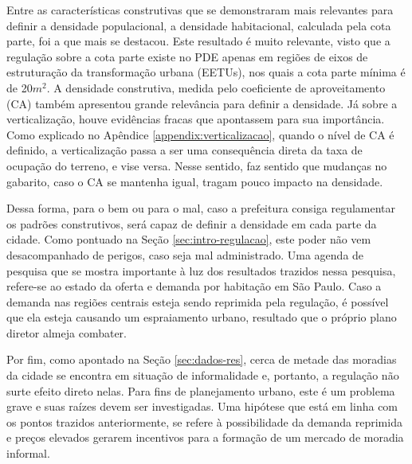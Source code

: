 Entre as características construtivas que se demonstraram mais relevantes para definir a densidade populacional, a densidade habitacional, calculada pela cota parte, foi a que mais se destacou. Este resultado é muito relevante, visto que a regulação sobre a cota parte existe no PDE apenas em regiões de eixos de estruturação da transformação urbana (EETUs), nos quais a cota parte mínima é de 20$m^2$. A densidade construtiva, medida pelo coeficiente de aproveitamento (CA) também apresentou grande relevância para definir a densidade. Já sobre a verticalização, houve evidências fracas que apontassem para sua importância. Como explicado no Apêndice \ref{appendix:verticalizacao}, quando o nível de CA é definido, a verticalização passa a ser uma consequência direta da taxa de ocupação do terreno, e vise versa. Nesse sentido, faz sentido que mudanças no gabarito, caso o CA se mantenha igual, tragam pouco impacto na densidade.

Dessa forma, para o bem ou para o mal, caso a prefeitura consiga regulamentar os padrões construtivos, será capaz de definir a densidade em cada parte da cidade. Como pontuado na Seção \ref{sec:intro-regulacao}, este poder não vem desacompanhado de perigos, caso seja mal administrado. Uma agenda de pesquisa que se mostra importante à luz dos resultados trazidos nessa pesquisa, refere-se ao estado da oferta e demanda por habitação em São Paulo. Caso a demanda nas regiões centrais esteja sendo reprimida pela regulação, é possível que ela esteja causando um espraiamento urbano, resultado que o próprio plano diretor almeja combater.

Por fim, como apontado na Seção \ref{sec:dados-res}, cerca de metade das moradias da cidade se encontra em situação de informalidade e, portanto, a regulação não surte efeito direto nelas. Para fins de planejamento urbano, este é um problema grave e suas raízes devem ser investigadas. Uma hipótese que está em linha com os pontos trazidos anteriormente, se refere à possibilidade da demanda reprimida e preços elevados gerarem incentivos para a formação de um mercado de moradia informal.



